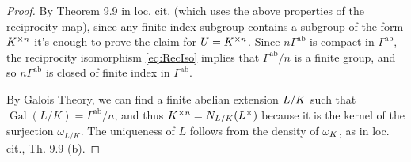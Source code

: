 \documentclass[a4paper, oneside]{memoir}
\begin{document}
\begin{proof}
    By Theorem 9.9 in loc. cit. (which uses the above properties of the reciprocity map), since any finite index subgroup contains a subgroup of the form $K^{\times n}$ it's enough to prove the claim for $U=K^{\times n}$. Since $n\Gamma^{\text{ab}}$ is compact in $\Gamma^{\text{ab}}$, the reciprocity isomorphism \eqref{eq:RecIso} implies that $\Gamma^{\text{ab}}/n$ is a finite group, and so $n\Gamma^{\text{ab}}$ is closed of finite index in $\Gamma^{\text{ab}}$.

    By Galois Theory, we can find a finite abelian extension $L/K$ such that $\operatorname{Gal}{(L/K)}=\Gamma^{\text{ab}}/n$, and thus $K^{\times n}=N_{L/K}(L^\times)$ because it is the kernel of the surjection $\omega_{L/K}$. The uniqueness of $L$ follows from the density of $\omega_K$, as in loc. cit., Th. 9.9 (b).
\end{proof}

\nocite{*}
\printbibliography
\end{document}
